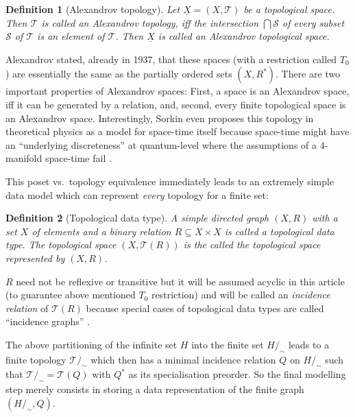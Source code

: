 \documentclass[5p]{elsarticle}
\newtheorem{dfn}{Definition}
\newcommand{\qq}[1]{``#1''}
\begin{document}
\begin{dfn}[Alexandrov topology]
Let $\underline{X} = (X,\mathcal{T})$ be a topological space. 
Then $\mathcal{T}$ is called an \emph{Alexandrov topology}, iff 
the intersection $\bigcap\mathcal{S}$ of every subset 
$\mathcal{S}$ of $\mathcal{T}$ is an element of $\mathcal{T}$. 
Then $\underline{X}$ is called an \emph{Alexandrov topological space}. 
\end{dfn}

Alexandrov stated, already in 1937, that these spaces (with a restriction called $T_0$) 
are essentially the same as the partially ordered sets $(X,R^{*})$. 
There are two important properties of Alexandrov spaces: 
First, a space is an Alexandrov space, iff it can be generated by a relation, and, 
second, every finite topological space is an Alexandrov space. 
Interestingly, Sorkin even proposes this topology in theoretical physics 
as a model for space-time itself because space-time might have an \qq{underlying discreteness} at 
quantum-level where the assumptions of a $4$-manifold space-time fail \cite{Sorkin:FinTop}. 

This poset vs.\ topology equivalence immediately leads to an extremely simple data model 
which can represent \emph{every} topology for a finite set: 

\begin{dfn}[Topological data type]
A simple directed graph $(X,R)$ with a set $X$ of elements and a binary 
relation $R\subseteq X\times X$ is called a \emph{topological data type}. 
The topological space $(X,\mathcal{T}(R))$ is the called the topological 
space \emph{represented by} $(X,R)$. 
\end{dfn}

$R$ need not be reflexive or transitive but it will be assumed acyclic in 
this article (to guarantee above mentioned $T_0$ restriction) 
and will be called an \emph{incidence relation} of $\mathcal{T}(R)$ because 
special cases of topological data types are called \qq{incidence graphs} 
\cite[p.\ 395]{Brisson:TopologyOrder}. 


The above partitioning of the infinite set $H$ into the finite set $H/_{\!\sim}$ leads to 
a finite topology $\mathcal{T}/_{\!\sim}$ which then has a minimal incidence relation $Q$ on 
$H/_{\!\sim}$ such that  $\mathcal{T}/_{\!\sim} = \mathcal{T}(Q)$ with $Q^{*}$ as its specialisation 
preorder. So the final modelling step merely consists in storing a data representation of the 
finite graph $(H/_{\!\sim},Q)$. 
\end{document}
